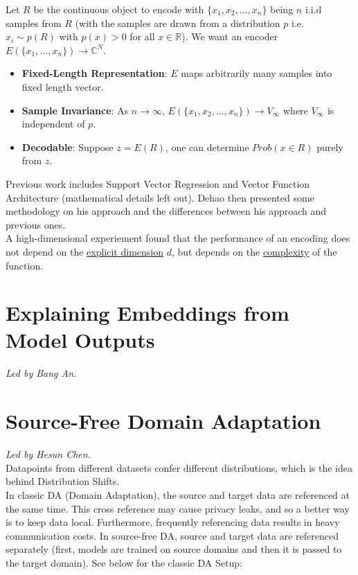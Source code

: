 \documentclass[12pt]{amsart}
\begin{document}
Let $R$ be the continuous object to encode with $\{x_1, x_2, \dots, x_n\}$ being $n$ i.i.d samples from $R$ (with the samples are drawn from a distribution $p$ i.e. $x_i \sim p(R)$ with $p(x) > 0$ for all $x \in \mathbb{R}$). We want an encoder $E(\{x_1, \dots, x_n\}) \rightarrow \mathbb{C}^N.$

\begin{itemize}
    \item \textbf{Fixed-Length Representation}: $E$ maps arbitrarily many samples into fixed length vector.
    \item \textbf{Sample Invariance}: As $n \rightarrow \infty$, $E(\{x_1, x_2, \dots, x_n\}) \rightarrow V_\infty$ where $V_\infty$ is independent of $p$.
    \item \textbf{Decodable}: Suppose $z=E(R)$, one can determine $Prob(x \in R)$ purely from $z$.
\end{itemize}

Previous work includes Support Vector Regression and Vector Function Architecture (mathematical details left out). Dehao then presented some methodology on his approach and the differences between his approach and previous ones. \\

A high-dimensional experiement found that the performance of an encoding does not depend on the \underline{explicit dimension} $d$, but depends on the \underline{complexity} of the function.

\section{Explaining Embeddings from Model Outputs}

\textit{Led by Bang An.} \\

\newpage


\section{Source-Free Domain Adaptation}

\textit{Led by Hesun Chen.} \\

Datapoints from different datasets confer different distributions, which is the idea behind Distribution Shifts. \\

In classic DA (Domain Adaptation), the source and target data are referenced at the same time. This cross reference may cause privacy leaks, and so a better way is to keep data local. Furthermore, frequently referencing data results in heavy communication costs. In source-free DA, source and target data are referenced separately (first, models are trained on source domains and then it is passed to the target domain). See below for the classic DA Setup:
\end{document}

